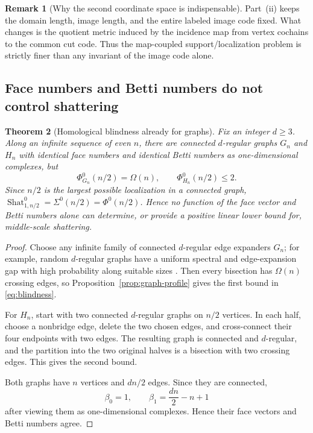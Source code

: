 \documentclass[11pt,letterpaper]{article}
\theoremstyle{plain}
\newtheorem{theorem}{Theorem}[section]
\theoremstyle{definition}
\newtheorem{remark}[theorem]{Remark}
\newcommand{\Shat}{\operatorname{Shat}}
\newcommand{\1}{\mathbf{1}}
\begin{document}
\begin{remark}[Why the second coordinate space is indispensable]
Part~(ii) keeps the domain length, image length, and the entire labeled image code
fixed.  What changes is the quotient metric induced by the incidence map from vertex
cochains to the common cut code.  Thus the map-coupled support/localization problem is
strictly finer than any invariant of the image code alone.
\end{remark}

\subsection{Face numbers and Betti numbers do not control shattering}

\begin{theorem}[Homological blindness already for graphs]
\label{thm:blindness}
Fix an integer $d\ge3$.  Along an infinite sequence of even $n$, there are connected
$d$-regular graphs $G_n$ and $H_n$ with identical face numbers and identical Betti
numbers as one-dimensional complexes, but
\begin{equation}\label{eq:blindness}
 \Phi_{G_n}^0(n/2)=\Omega(n),
 \qquad
 \Phi_{H_n}^0(n/2)\le2.
\end{equation}
Since $n/2$ is the largest possible localization in a connected graph,
$\Shat_{1,n/2}^0=\Sigma^0(n/2)=\Phi^0(n/2)$.  Hence no function of the face vector and
Betti numbers alone can determine, or provide a positive linear lower bound for,
middle-scale shattering.
\end{theorem}

\begin{proof}
Choose any infinite family of connected $d$-regular edge expanders $G_n$; for example,
random $d$-regular graphs have a uniform spectral and edge-expansion gap with high
probability along suitable sizes \cite{friedman2008}.  Then every bisection has
$\Omega(n)$ crossing edges, so Proposition~\ref{prop:graph-profile} gives the first
bound in \eqref{eq:blindness}.

For $H_n$, start with two connected $d$-regular graphs on $n/2$ vertices.  In each half,
choose a nonbridge edge, delete the two chosen edges, and cross-connect their four
endpoints with two edges.  The resulting graph is connected and $d$-regular, and the
partition into the two original halves is a bisection with two crossing edges.  This
gives the second bound.

Both graphs have $n$ vertices and $dn/2$ edges.  Since they are connected,
\[
 \beta_0=1,
 \qquad
 \beta_1=\frac{dn}{2}-n+1
\]
after viewing them as one-dimensional complexes.  Hence their face vectors and Betti
numbers agree.
\end{proof}
\end{document}
